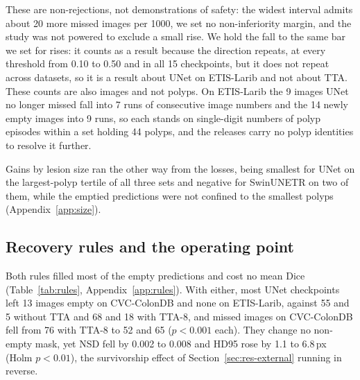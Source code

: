 These are non-rejections, not demonstrations of safety: the widest interval admits about 20 more missed images per 1000, we set no non-inferiority margin, and the study was not powered to exclude a small rise. We hold the fall to the same bar we set for rises: it counts as a result because the direction repeats, at every threshold from 0.10 to 0.50 and in all 15 checkpoints, but it does not repeat across datasets, so it is a result about UNet on ETIS-Larib and not about TTA. These counts are also images and not polyps. On ETIS-Larib the 9 images UNet no longer missed fall into 7 runs of consecutive image numbers and the 14 newly empty images into 9 runs, so each stands on single-digit numbers of polyp episodes within a set holding 44 polyps, and the releases carry no polyp identities to resolve it further.

Gains by lesion size ran the other way from the losses, being smallest for UNet on the largest-polyp tertile of all three sets and negative for SwinUNETR on two of them, while the emptied predictions were not confined to the smallest polyps (Appendix~\ref{app:size}).




\subsection{Recovery rules and the operating point}
\label{sec:res-rules}
Both rules filled most of the empty predictions and cost no mean Dice (Table~\ref{tab:rules}, Appendix~\ref{app:rules}). With either, most UNet checkpoints left 13 images empty on CVC-ColonDB and none on ETIS-Larib, against 55 and 5 without TTA and 68 and 18 with TTA-8, and missed images on CVC-ColonDB fell from 76 with TTA-8 to 52 and 65 ($p<0.001$ each). They change no non-empty mask, yet NSD fell by 0.002 to 0.008 and HD95 rose by 1.1 to 6.8\,px (Holm $p<0.01$), the survivorship effect of Section~\ref{sec:res-external} running in reverse.

